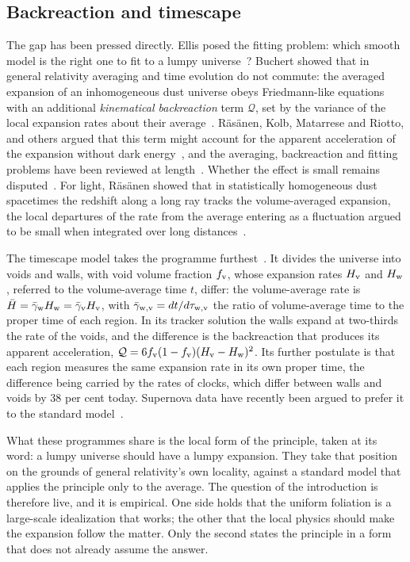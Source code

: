 \documentclass[11pt,a4paper]{article}
\begin{document}
\subsection{Backreaction and timescape}\label{sec:backreaction}

The gap has been pressed directly. Ellis posed the fitting problem: which smooth model is the right one to fit to a lumpy universe~\cite{Ellis1984}? Buchert showed that in general relativity averaging and time evolution do not commute: the averaged expansion of an inhomogeneous dust universe obeys Friedmann-like equations with an additional \emph{kinematical backreaction} term $\mathcal{Q}$, set by the variance of the local expansion rates about their average~\cite{Buchert2000, Buchert2008}. R\"as\"anen, Kolb, Matarrese and Riotto, and others argued that this term might account for the apparent acceleration of the expansion without dark energy~\cite{Rasanen2004, Kolb2006}, and the averaging, backreaction and fitting problems have been reviewed at length~\cite{Clarkson2011, BuchertRasanen2012}. Whether the effect is small remains disputed~\cite{GreenWald2011, GreenWald2014, Buchert2015}. For light, R\"as\"anen showed that in statistically homogeneous dust spacetimes the redshift along a long ray tracks the volume-averaged expansion, the local departures of the rate from the average entering as a fluctuation argued to be small when integrated over long distances~\cite{Rasanen2009}.

The timescape model takes the programme furthest~\cite{Wiltshire2007, Wiltshire2007PRL, Wiltshire2009}. It divides the universe into voids and walls, with void volume fraction $f_{\rm v}$, whose expansion rates $H_{\rm v}$ and $H_{\rm w}$, referred to the volume-average time $t$, differ: the volume-average rate is $\bar H=\bar\gamma_{\rm w}H_{\rm w}=\bar\gamma_{\rm v}H_{\rm v}$, with $\bar\gamma_{\rm w,v}=dt/d\tau_{\rm w,v}$ the ratio of volume-average time to the proper time of each region. In its tracker solution the walls expand at two-thirds the rate of the voids, and the difference is the backreaction that produces its apparent acceleration, $\mathcal{Q}=6f_{\rm v}(1-f_{\rm v})(H_{\rm v}-H_{\rm w})^{2}$. Its further postulate is that each region measures the same expansion rate in its own proper time, the difference being carried by the rates of clocks, which differ between walls and voids by 38 per cent today. Supernova data have recently been argued to prefer it to the standard model~\cite{Seifert2025}.

What these programmes share is the local form of the principle, taken at its word: a lumpy universe should have a lumpy expansion. They take that position on the grounds of general relativity's own locality, against a standard model that applies the principle only to the average. The question of the introduction is therefore live, and it is empirical. One side holds that the uniform foliation is a large-scale idealization that works; the other that the local physics should make the expansion follow the matter. Only the second states the principle in a form that does not already assume the answer.
\end{document}
